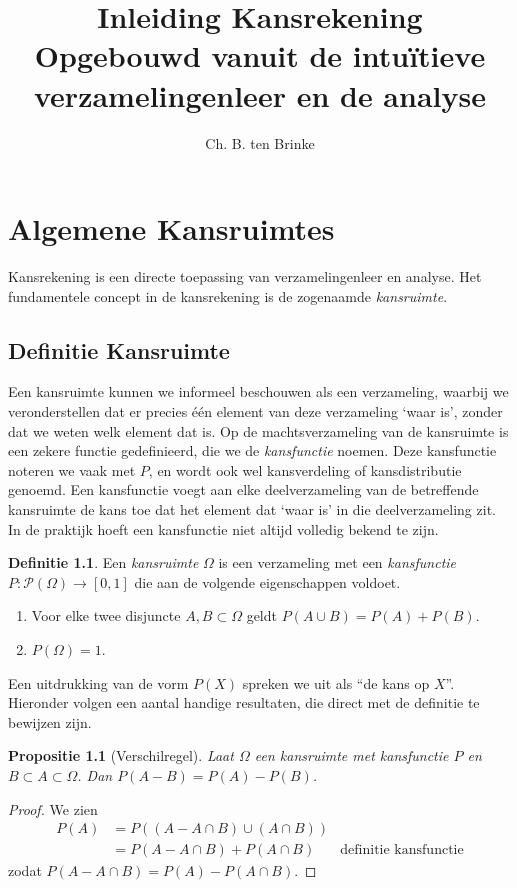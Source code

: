 \documentclass[a4paper]{report}
\title{Inleiding Kansrekening \\ \small{Opgebouwd vanuit de intu\"itieve verzamelingenleer en de analyse}}
\author{Ch. B. ten Brinke}
\newtheorem{proposition}[theorem]{Propositie}
\theoremstyle{definition}
\newtheorem{definition}[theorem]{Definitie}
\begin{document}
\maketitle

\chapter{Algemene Kansruimtes}
Kansrekening is een directe toepassing van verzamelingenleer en analyse.
Het fundamentele concept in de kansrekening is de zogenaamde \emph{kansruimte}.

\section{Definitie Kansruimte}
Een kansruimte kunnen we informeel beschouwen als een verzameling, waarbij we veronderstellen dat er precies \'e\'en element van deze verzameling `waar is', zonder dat we weten welk element dat is.
Op de machtsverzameling van de kansruimte is een zekere functie gedefinieerd, die we de \emph{kansfunctie} noemen.
Deze kansfunctie noteren we vaak met $P$, en wordt ook wel kansverdeling of kansdistributie genoemd.
Een kansfunctie voegt aan elke deelverzameling van de betreffende kansruimte de kans toe dat het element dat `waar is' in die deelverzameling zit.
In de praktijk hoeft een kansfunctie niet altijd volledig bekend te zijn.

\begin{definition}
    Een \emph{kansruimte} $\Omega$ is een verzameling met een \emph{kansfunctie} $P: \mathcal P(\Omega) \to [0,1]$  die aan de volgende eigenschappen voldoet.
    \begin{enumerate}[i]
        \item Voor elke twee disjuncte $A,B \subset \Omega$ geldt $P(A \cup B) = P(A) + P(B)$.
        \item $P(\Omega) = 1$.
    \end{enumerate}
\end{definition}

Een uitdrukking van de vorm $P(X)$ spreken we uit als ``de kans op $X$''.
Hieronder volgen een aantal handige resultaten, die direct met de definitie te bewijzen zijn.

\begin{proposition}[Verschilregel]
    \label{verschilregel}
    Laat $\Omega$ een kansruimte met kansfunctie $P$ en $B \subset A \subset \Omega$.
    Dan $P(A - B) = P(A) - P(B)$.
\end{proposition}
\begin{proof}
    We zien
    \begin{align*}
        P(A)    &= P( (A - A \cap B) \cup (A \cap B) ) \\ 
                &= P(A - A \cap B ) + P(A \cap B) & \text{definitie kansfunctie}
    \end{align*}
    zodat $P(A - A \cap B ) = P(A) - P(A \cap B) $.
\end{proof}
\end{document}
